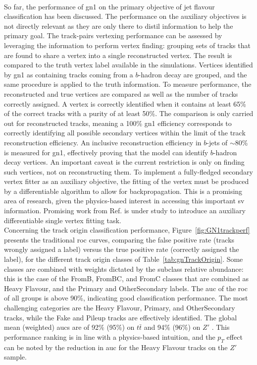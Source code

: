 \paragraph{}So far, the performance of \gls{gn1} on the primary objective of jet flavour classification has been discussed. The performance on the auxiliary objectives is not directly relevant as they are only there to distil information to help the primary goal. The track-pairs vertexing performance can be assessed by leveraging the information to perform vertex finding: grouping sets of tracks that are found to share a vertex into a single reconstructed vertex. The result is compared to the truth vertex label available in the simulations. Vertices identified by \gls{gn1} as containing tracks coming from a $b$-hadron decay are grouped, and the same procedure is applied to the truth information. To measure performance, the reconstructed and true vertices are compared as well as the number of tracks correctly assigned. A vertex is correctly identified when it contains at least 65\% of the correct tracks with a purity of at least 50\%. The comparison is only carried out for reconstructed tracks, meaning a 100\% \gls{gn1} efficiency corresponds to correctly identifying all possible secondary vertices within the limit of the track reconstruction efficiency. An inclusive reconstruction efficiency in $b$-jets of $\sim$80\% is measured for \gls{gn1}, effectively proving that the model can identify $b$-hadron decay vertices. An important caveat is the current restriction is only on finding such vertices, not on reconstructing them. To implement a fully-fledged secondary vertex fitter as an auxiliary objective, the fitting of the vertex must be produced by a differentiable algorithm to allow for backpropagation. This is a promising area of research, given the physics-based interest in accessing this important \gls{sv} information. Promising work from Ref. \cite{smith2023differentiable} is under study to introduce an auxiliary differentiable single vertex fitting task. \\

Concerning the track origin classification performance, Figure~\ref{fig:GN1trackperf} presents the traditional \gls{roc} curves, comparing the false positive rate (tracks wrongly assigned a label) versus the true positive rate (correctly assigned the label), for the different track origin classes of Table~\ref{tab:gnTrackOrigin}. Some classes are combined with weights dictated by the subclass relative abundance: this is the case of the FromB, FromBC, and FromC classes that are combined as Heavy Flavour, and the Primary and OtherSecondary labels. The \gls{auc} of the \gls{roc} of all groups is above 90\%, indicating good classification performance. The most challenging categories are the Heavy Flavour, Primary, and OtherSecondary tracks, while the Fake and Pileup tracks are effectively identified. The global mean (weighted) \glspl{auc} are of 92\% (95\%) on $t\bar{t}$ and 94\% (96\%) on $Z'$ \cite{ATL-PHYS-PUB-2022-027}. This performance ranking is in line with a physics-based intuition, and the $p_T$ effect can be noted by the reduction in \gls{auc} for the Heavy Flavour tracks on the $Z'$ sample. \\

